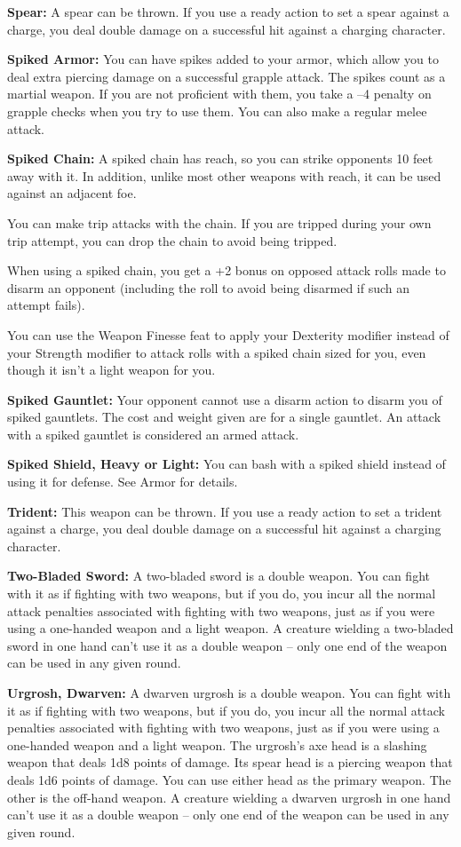 \begin{multicols}{2}
\textbf{Spear:} A spear can be thrown. If you use a ready action to set a spear against a charge, you deal double damage on a successful hit against a charging character.

\textbf{Spiked Armor:} You can have spikes added to your armor, which allow you to deal extra piercing damage on a successful grapple attack. The spikes count as a martial weapon. If you are not proficient with them, you take a –4 penalty on grapple checks when you try to use them. You can also make a regular melee attack.

\textbf{Spiked Chain:} A spiked chain has reach, so you can strike opponents 10 feet away with it. In addition, unlike most other weapons with reach, it can be used against an adjacent foe.

You can make trip attacks with the chain. If you are tripped during your own trip attempt, you can drop the chain to avoid being tripped.

When using a spiked chain, you get a +2 bonus on opposed attack rolls made to disarm an opponent (including the roll to avoid being disarmed if such an attempt fails).

You can use the Weapon Finesse feat to apply your Dexterity modifier instead of your Strength modifier to attack rolls with a spiked chain sized for you, even though it isn't a light weapon for you.

\textbf{Spiked Gauntlet:} Your opponent cannot use a disarm action to disarm you of spiked gauntlets. The cost and weight given are for a single gauntlet. An attack with a spiked gauntlet is considered an armed attack.

\textbf{Spiked Shield, Heavy or Light:} You can bash with a spiked shield instead of using it for defense. See Armor for details.

\textbf{Trident:} This weapon can be thrown. If you use a ready action to set a trident against a charge, you deal double damage on a successful hit against a charging character.

\textbf{Two-Bladed Sword:} A two-bladed sword is a double weapon. You can fight with it as if fighting with two weapons, but if you do, you incur all the normal attack penalties associated with fighting with two weapons, just as if you were using a one-handed weapon and a light weapon. A creature wielding a two-bladed sword in one hand can't use it as a double weapon -- only one end of the weapon can be used in any given round.

\textbf{Urgrosh, Dwarven:} A dwarven urgrosh is a double weapon. You can fight with it as if fighting with two weapons, but if you do, you incur all the normal attack penalties associated with fighting with two weapons, just as if you were using a one-handed weapon and a light weapon. The urgrosh's axe head is a slashing weapon that deals 1d8 points of damage. Its spear head is a piercing weapon that deals 1d6 points of damage. You can use either head as the primary weapon. The other is the off-hand weapon. A creature wielding a dwarven urgrosh in one hand can't use it as a double weapon -- only one end of the weapon can be used in any given round.


\end{multicols}
